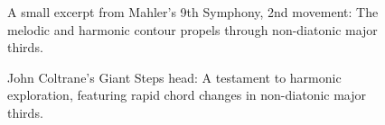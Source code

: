 \begin{figure}[ht]
    \centering
    \caption[Mahler's 9th Symphony, 2nd movement]{\small{A small excerpt from Mahler's 9th Symphony, 2nd movement: The melodic and harmonic contour propels through non-diatonic major thirds.}}
    \label{fig:mahler}
\end{figure}

\begin{figure}[ht]
    \centering
    \caption[Giant Steps]{\small{John Coltrane's Giant Steps head: A testament to harmonic exploration, featuring rapid chord changes in non-diatonic major thirds.}}
    \label{fig:giant_steps}
\end{figure}
